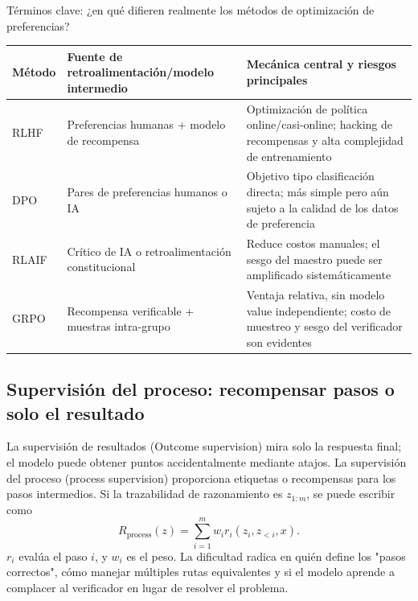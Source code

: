 \begin{knowledgebox}{Términos clave: ¿en qué difieren realmente los métodos de optimización de preferencias?}
\begin{tabularx}{\textwidth}{p{}p{}X}
\toprule
Método & Fuente de retroalimentación/modelo intermedio & Mecánica central y riesgos principales \\
\midrule
RLHF & Preferencias humanas + modelo de recompensa & Optimización de política online/casi-online; hacking de recompensas y alta complejidad de entrenamiento \\
DPO & Pares de preferencias humanos o IA & Objetivo tipo clasificación directa; más simple pero aún sujeto a la calidad de los datos de preferencia \\
RLAIF & Crítico de IA o retroalimentación constitucional & Reduce costos manuales; el sesgo del maestro puede ser amplificado sistemáticamente \\
GRPO & Recompensa verificable + muestras intra-grupo & Ventaja relativa, sin modelo value independiente; costo de muestreo y sesgo del verificador son evidentes \\
\bottomrule
\end{tabularx}
\end{knowledgebox}

\subsection{Supervisión del proceso: recompensar pasos o solo el resultado}

La supervisión de resultados (Outcome supervision) mira solo la respuesta final; el modelo puede obtener puntos accidentalmente mediante atajos. La supervisión del proceso (process supervision) proporciona etiquetas o recompensas para los pasos intermedios. Si la trazabilidad de razonamiento es $z_{1:m}$, se puede escribir como
\[
R_{\mathrm{process}}(z)=\sum_{i=1}^{m}w_i r_i(z_i,z_{<i},x).
\]
$r_i$ evalúa el paso $i$, y $w_i$ es el peso. La dificultad radica en quién define los "pasos correctos", cómo manejar múltiples rutas equivalentes y si el modelo aprende a complacer al verificador en lugar de resolver el problema.



